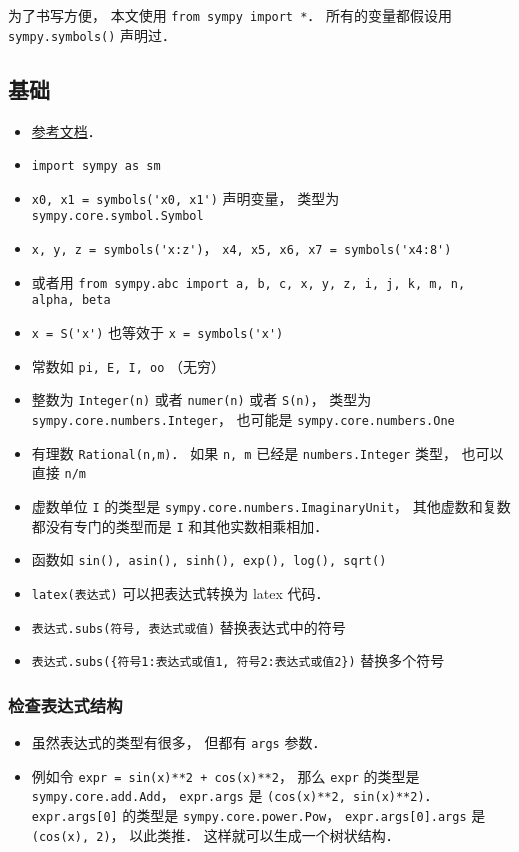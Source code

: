 
\begin{issues}
\issueDraft
\end{issues}


为了书写方便， 本文使用 \verb|from sympy import *|． 所有的变量都假设用 \verb|sympy.symbols()| 声明过．

\subsection{基础}
\begin{itemize}
\item \href{https://docs.sympy.org/latest/reference/index.html}{参考文档}．
\item \verb|import sympy as sm|
\item \verb|x0, x1 = symbols('x0, x1')| 声明变量， 类型为 \verb|sympy.core.symbol.Symbol|
\item \verb|x, y, z = symbols('x:z')|， \verb|x4, x5, x6, x7 = symbols('x4:8')|
\item 或者用 \verb|from sympy.abc import a, b, c, x, y, z, i, j, k, m, n, alpha, beta|
\item \verb|x = S('x')| 也等效于 \verb|x = symbols('x')|
\item 常数如 \verb|pi, E, I, oo| （无穷）
\item 整数为 \verb|Integer(n)| 或者 \verb|numer(n)| 或者 \verb|S(n)|， 类型为 \verb|sympy.core.numbers.Integer|， 也可能是 \verb|sympy.core.numbers.One|
\item 有理数 \verb|Rational(n,m)|． 如果 \verb|n, m| 已经是 \verb|numbers.Integer| 类型， 也可以直接 \verb|n/m|
\item 虚数单位 \verb|I| 的类型是 \verb|sympy.core.numbers.ImaginaryUnit|， 其他虚数和复数都没有专门的类型而是 \verb|I| 和其他实数相乘相加．
\item 函数如 \verb|sin(), asin(), sinh(), exp(), log(), sqrt()|
\item \verb|latex(表达式)| 可以把表达式转换为 latex 代码．
\item \verb|表达式.subs(符号, 表达式或值)| 替换表达式中的符号
\item \verb|表达式.subs({符号1:表达式或值1, 符号2:表达式或值2})| 替换多个符号
\end{itemize}

\subsubsection{检查表达式结构}
\begin{itemize}
\item 虽然表达式的类型有很多， 但都有 \verb|args| 参数．
\item 例如令 \verb|expr = sin(x)**2 + cos(x)**2|， 那么 \verb|expr| 的类型是 \verb|sympy.core.add.Add|， \verb|expr.args| 是 \verb|(cos(x)**2, sin(x)**2)|． \verb|expr.args[0]| 的类型是 \verb|sympy.core.power.Pow|， \verb|expr.args[0].args| 是 \verb|(cos(x), 2)|， 以此类推． 这样就可以生成一个树状结构．
\end{itemize}

